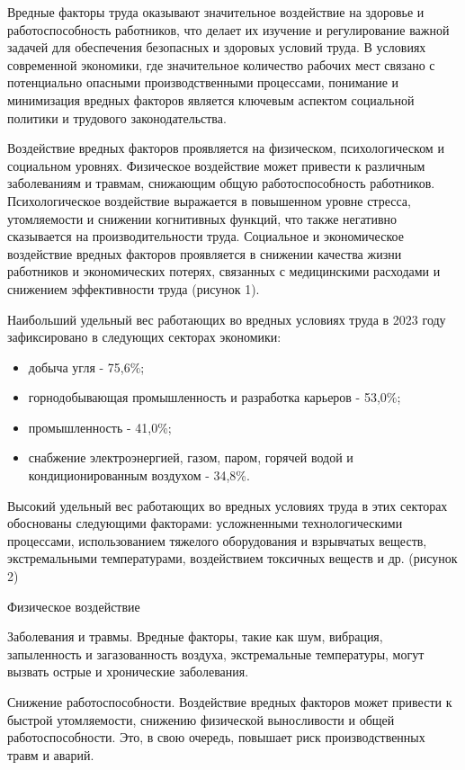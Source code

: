 Вредные факторы труда оказывают значительное воздействие на здоровье и
работоспособность работников, что делает их изучение и регулирование
важной задачей для обеспечения безопасных и здоровых условий труда. В
условиях современной экономики, где значительное количество рабочих мест
связано с потенциально опасными производственными процессами, понимание
и минимизация вредных факторов является ключевым аспектом социальной
политики и трудового законодательства.

Воздействие вредных факторов проявляется на физическом, психологическом
и социальном уровнях. Физическое воздействие может привести к различным
заболеваниям и травмам, снижающим общую работоспособность работников.
Психологическое воздействие выражается в повышенном уровне стресса,
утомляемости и снижении когнитивных функций, что также негативно
сказывается на производительности труда. Социальное и экономическое
воздействие вредных факторов проявляется в снижении качества жизни
работников и экономических потерях, связанных с медицинскими расходами и
снижением эффективности труда (рисунок 1).

Наибольший удельный вес работающих во вредных условиях труда в 2023 году
зафиксировано в следующих секторах экономики:

\begin{itemize}
\item
  добыча угля - 75,6\%;
\item
  горнодобывающая промышленность и разработка карьеров - 53,0\%;
\item
  промышленность - 41,0\%;
\item
  снабжение электроэнергией, газом, паром, горячей водой и
  кондиционированным воздухом - 34,8\%.
\end{itemize}

Высокий удельный вес работающих во вредных условиях труда в этих
секторах обоснованы следующими факторами: усложненными технологическими
процессами, использованием тяжелого оборудования и взрывчатых веществ,
экстремальными температурами, воздействием токсичных веществ и др.
(рисунок 2)

Физическое воздействие

Заболевания и травмы. Вредные факторы, такие как шум, вибрация,
запыленность и загазованность воздуха, экстремальные температуры, могут
вызвать острые и хронические заболевания.

Снижение работоспособности. Воздействие вредных факторов может привести
к быстрой утомляемости, снижению физической выносливости и общей
работоспособности. Это, в свою очередь, повышает риск производственных
травм и аварий.

